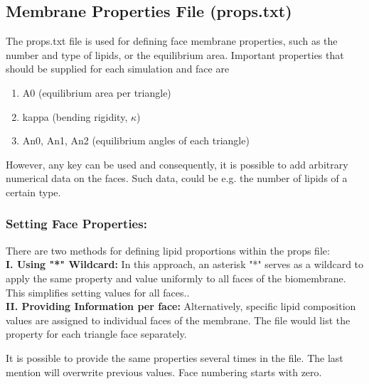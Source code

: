 \documentclass[11pt]{article}
\begin{document}
\subsection{Membrane Properties File (props.txt)}
The props.txt file is used for defining face membrane properties, such as the number and type of lipids, or the equilibrium area. Important properties that should be supplied for each simulation and face are \begin{enumerate}
    \item A0 (equilibrium area per triangle)
    \item kappa (bending rigidity, $\kappa$)
    \item An0, An1, An2 (equilibrium angles of each triangle)
\end{enumerate}
However, any key can be used and consequently, it is possible to add arbitrary numerical data on the faces. Such data, could be e.g. the number of lipids of a certain type.

\subsubsection*{Setting Face Properties:}
There are two methods for defining lipid proportions within the props file:
\\
\noindent 
\textbf{I. Using "*" Wildcard:} 
In this approach, an asterisk "*" serves as a wildcard to apply the same property and value uniformly to all faces of the biomembrane. This simplifies setting values for all faces..
\\
\noindent
\textbf{II. Providing Information per face:} Alternatively, specific lipid composition values are assigned to individual faces of the membrane. The file would list the property for each triangle face separately. \\

\begin{tcolorbox}[colback=orange!5!white,colframe=orange!75!black,title=Clarification]
It is possible to provide the same properties several times in the file. The last mention will overwrite previous values. Face numbering starts with zero.
\end{tcolorbox}
\end{document}
